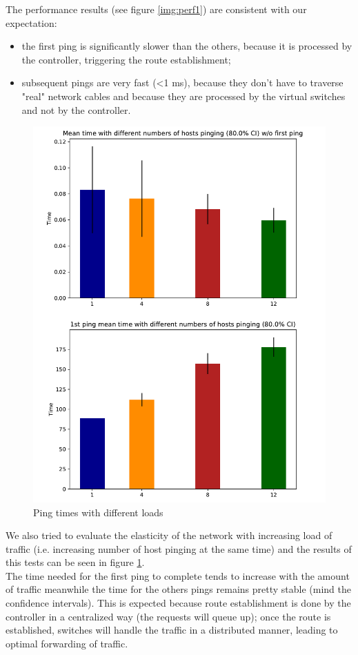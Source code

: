 The performance results (see figure \ref{img:perf1}) are consistent with our expectation:
\begin{itemize}
    \item the first ping is significantly slower than the others, because it is processed by the controller, triggering the route establishment;
    \item subsequent pings are very fast (<1 ms), because they don't have to traverse "real" network cables and because they are processed by the virtual switches and not by the controller.
\end{itemize}
\newpage
\begin{figure}[h]
    \centering
    \includegraphics[width=.94\textwidth]{img/increasing_ping_time.pdf}
    \caption{Ping times with different loads}
    \label{img:perf2}
\end{figure}
\noindent We also tried to evaluate the elasticity of the network with increasing load of traffic (i.e. increasing number of host pinging at the same time) and the results of this tests can be seen in figure \ref{img:perf2}.\\
The time needed for the first ping to complete tends to increase with the amount of traffic meanwhile the time for the others pings remains pretty stable
(mind the confidence intervals). This is expected because route establishment is done by the controller in a centralized way (the requests will queue up);
once the route is established, switches will handle the traffic in a distributed manner, leading to optimal forwarding of traffic.